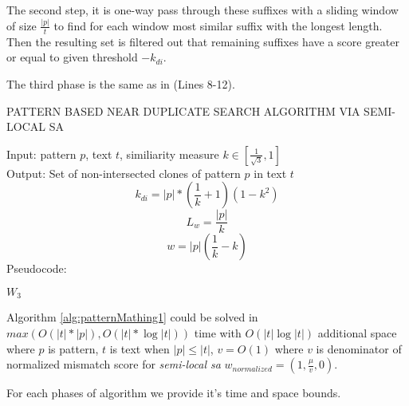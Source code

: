The second step, it is one-way pass through these suffixes with a sliding window of size $\frac{|p|}{t}$ to find for each window most similar suffix with the longest length. Then the resulting set is filtered out that remaining suffixes have a score greater or equal to given threshold $-k_{di}$. 

The third phase is the same as in \cite{luciv2019interactive} (Lines 8-12).  



\begin{algorithm}[H]
\caption{PATTERN BASED NEAR DUPLICATE
SEARCH ALGORITHM VIA SEMI-LOCAL SA}
\label{alg:patternMathing1}
Input: pattern $p$, text $t$, similiarity measure $k \in  [ \frac{1}{\sqrt{3}} ,1  ]$\\
Output: Set of non-intersected clones of pattern $p$ in text $t$
\begin{equation}
    k_{di}=|p|*(\frac{1}{k}+1)(1-k^2)
\end{equation}
\begin{equation}
 L_{w} = \frac{|p|} {k}
\end{equation}
\begin{equation}
  w = |p|(\frac{1}{k} - k)
\end{equation}
Pseudocode:
\begin{algorithmic}[1]
\ENDIF
\ENDFOR
\RETURN $W_3$

\end{algorithmic}
\end{algorithm}


\begin{theorem}
Algorithm \ref{alg:patternMathing1} could  be solved in
 $max(O(|t|*|p|),O(|t| * \log |t|))$  time with $O( |t| \log |t|)$ additional space where $p$ is pattern, $t$ is text when $|p| \leq |t|$, $v=O(1)$ where $v$ is denominator of normalized mismatch score for \emph{semi-local sa}
$w_{normalized} = (1,\frac{\mu}{v},0)$.
\end{theorem}

For each phases of algorithm we provide it's time and space bounds.

